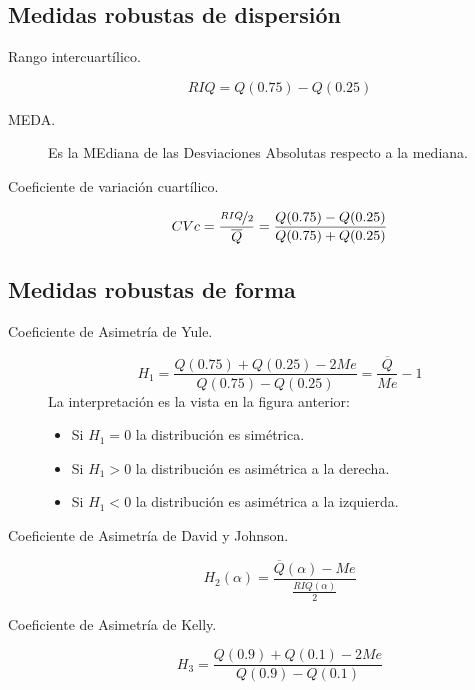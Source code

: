 \subsection{Medidas robustas de dispersión}
\begin{description}
    \item [Rango intercuartílico.] 
        \begin{equation*}
            RIQ = Q(0.75) - Q(0.25)
        \end{equation*}
    \item [MEDA.] Es la MEdiana de las Desviaciones Absolutas respecto a la mediana.
    \item [Coeficiente de variación cuartílico.]
        \begin{equation*}
            CVc = \frac{\nicefrac{RIQ}{2}}{\overline{Q}} = \frac{Q(0.75)-Q(0.25)}{Q(0.75)+Q(0.25)}
        \end{equation*}
\end{description}
\subsection{Medidas robustas de forma}
\begin{description}
    \item[Coeficiente de Asimetría de Yule.]
        \begin{equation*}
            H_1 = \frac{Q(0.75)+Q(0.25) - 2Me}{Q(0.75)-Q(0.25)} = \frac{\overline{Q}}{Me} - 1
        \end{equation*}
        La interpretación es la vista en la figura anterior:
        \begin{itemize}
            \item Si $H_1=0$ la distribución es simétrica.
            \item Si $H_1>0$ la distribución es asimétrica a la derecha.
            \item Si $H_1<0$ la distribución es asimétrica a la izquierda.
        \end{itemize}
    \item[Coeficiente de Asimetría de David y Johnson.]
        \begin{equation*}
            H_2(\alpha) = \frac{\overline{Q}(\alpha) - Me}{\frac{RIQ(\alpha)}{2}}
        \end{equation*}
    \item[Coeficiente de Asimetría de Kelly.]
        \begin{equation*}
            H_3 = \frac{Q(0.9)+Q(0.1) - 2Me}{Q(0.9)-Q(0.1)}
        \end{equation*}
\end{description}

